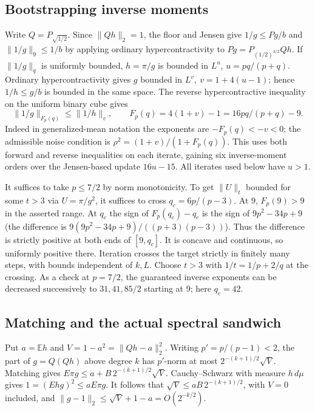 \documentclass[11pt]{article}
\newcommand{\E}{\mathbb E}
\begin{document}
\subsection{Bootstrapping inverse moments}
Write \(Q=P_{\sqrt{1/2}}\). Since \(\|Qh\|_2=1\), the floor and Jensen give \(1/g\le Pg/b\) and \(\|1/g\|_9\le1/b\) by applying ordinary hypercontractivity to \(Pg=P_{(1/2)^{3/2}}Qh\). If \(\|1/g\|_q\) is uniformly bounded, \(h=\pi/g\) is bounded in \(L^u\), \(u=pq/(p+q)\). Ordinary hypercontractivity gives \(g\) bounded in \(L^v,\ v=1+4(u-1)\); hence \(1/h\le g/b\) is bounded in the same space. The reverse hypercontractive inequality on the uniform binary cube \cite[Eq.~(1.2)]{mos} gives
\[
 \|1/g\|_{F_p(q)}\le \|1/h\|_v,\qquad F_p(q)=4(1+v)-1=16pq/(p+q)-9 .
\]
Indeed in generalized-mean notation the exponents are \(-F_p(q)<-v<0\); the admissible noise condition is \(\rho^2=(1+v)/(1+F_p(q))\). This uses both forward and reverse inequalities on each iterate, gaining six inverse-moment orders over the Jensen-based update \(16u-15\). All iterates used below have \(u>1\).

It suffices to take \(p\le7/2\) by norm monotonicity. To get \(\|U\|_t\) bounded for some \(t>3\) via \(U=\pi/g^2\), it suffices to cross \(q_c=6p/(p-3)\). At \(9\), \(F_p(9)>9\) in the asserted range. At \(q_c\) the sign of \(F_p(q_c)-q_c\) is the sign of \(9p^2-34p+9\) (the difference is \(9(9p^2-34p+9)/((p+3)(p-3))\)). Thus the difference is strictly positive at both ends of \([9,q_c]\). It is concave and continuous, so uniformly positive there. Iteration crosses the target strictly in finitely many steps, with bounds independent of \(k,L\). Choose \(t>3\) with \(1/t=1/p+2/q\) at the crossing. As a check at \(p=7/2\), the guaranteed inverse exponents can be decreased successively to \(31,41,85/2\) starting at 9; here \(q_c=42\).

\subsection{Matching and the actual spectral sandwich}

Put \(a=\E h\) and \(V=1-a^2=\|Qh-a\|_2^2\). Writing \(p'=p/(p-1)<2\), the part of \(g=Q(Qh)\) above degree \(k\) has \(p'\)-norm at most \(2^{-(k+1)/2}\sqrt V\). Matching gives \(E\pi g\le a+B\,2^{-(k+1)/2}\sqrt V\). Cauchy--Schwarz with measure \(h\,d\mu\) gives \(1=(Ehg)^2\le aE\pi g\). It follows that \(\sqrt V\le aB\,2^{-(k+1)/2}\), with \(V=0\) included, and \(\|g-1\|_2\le \sqrt V+1-a=O(2^{-k/2})\).
\end{document}
